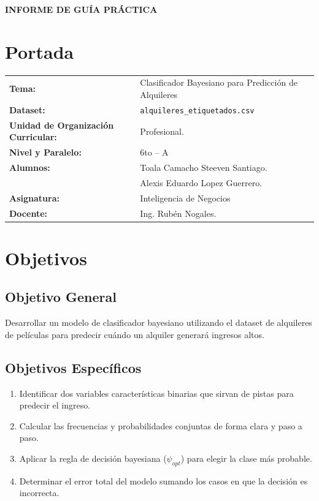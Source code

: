 \documentclass[12pt,a4paper]{article}
\begin{document}
\begin{center}{\large\textbf{INFORME DE GU\'IA PR\'ACTICA}}\end{center}

\section{Portada}
\begin{flushleft}\renewcommand{\arraystretch}{1.3}
\begin{tabular}{@{} l p{10cm} @{}}
  \textbf{Tema:} & Clasificador Bayesiano para Predicci\'on de Alquileres \\
  \textbf{Dataset:} & \texttt{alquileres\_etiquetados.csv} \\
  \textbf{Unidad de Organizaci\'on Curricular:} & Profesional. \\
  \textbf{Nivel y Paralelo:} & 6to -- A \\
  \textbf{Alumnos:} & Toala Camacho Steeven Santiago. \\ & Alexis Eduardo Lopez Guerrero. \\
  \textbf{Asignatura:} & Inteligencia de Negocios \\
  \textbf{Docente:} & Ing. Rub\'en Nogales. \\
\end{tabular}\end{flushleft}

\section{Objetivos}
\subsection*{Objetivo General}
Desarrollar un modelo de clasificador bayesiano utilizando el dataset de alquileres de pel\'iculas para predecir cu\'ando un alquiler generar\'a ingresos altos.
\subsection*{Objetivos Espec\'ificos}
\begin{enumerate}[label=\arabic*.]
  \item Identificar dos variables caracter\'isticas binarias que sirvan de pistas para predecir el ingreso.
  \item Calcular las frecuencias y probabilidades conjuntas de forma clara y paso a paso.
  \item Aplicar la regla de decisi\'on bayesiana ($\psi_{opt}$) para elegir la clase m\'as probable.
  \item Determinar el error total del modelo sumando los casos en que la decisi\'on es incorrecta.
\end{enumerate}
\end{document}
